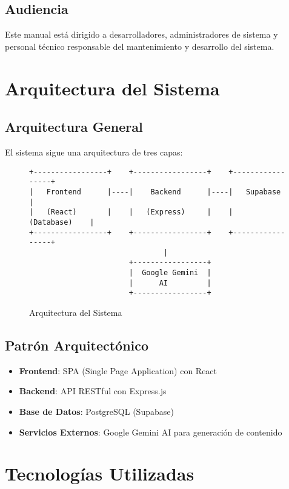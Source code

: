 \documentclass[12pt,a4paper]{report}
\begin{document}
\section{Audiencia}
Este manual está dirigido a desarrolladores, administradores de sistema y personal técnico responsable del mantenimiento y desarrollo del sistema.

\chapter{Arquitectura del Sistema}

\section{Arquitectura General}
El sistema sigue una arquitectura de tres capas:

\begin{figure}[h]
\centering
\begin{verbatim}
+-----------------+    +-----------------+    +-----------------+
|   Frontend      |----|    Backend      |----|   Supabase      |
|   (React)       |    |   (Express)     |    |   (Database)    |
+-----------------+    +-----------------+    +-----------------+
                               |
                       +-----------------+
                       |  Google Gemini  |
                       |      AI         |
                       +-----------------+
\end{verbatim}
\caption{Arquitectura del Sistema}
\end{figure}

\section{Patrón Arquitectónico}
\begin{itemize}
    \item \textbf{Frontend}: SPA (Single Page Application) con React
    \item \textbf{Backend}: API RESTful con Express.js
    \item \textbf{Base de Datos}: PostgreSQL (Supabase)
    \item \textbf{Servicios Externos}: Google Gemini AI para generación de contenido
\end{itemize}

\chapter{Tecnologías Utilizadas}
\end{document}
